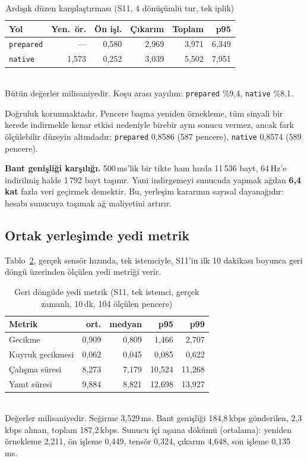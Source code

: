 \documentclass[conference]{IEEEtran}
\newcommand{\ms}{\,ms\xspace}
\begin{document}
\begin{table}[t]
\caption{Ardışık düzen karşılaştırması (S11, 4 dönüşümlü tur, tek iplik)}
\label{tab:pipeline}
\centering
\small
\setlength{\tabcolsep}{4pt}
\begin{tabular}{lrrrrr}
\toprule
\textbf{Yol} & \textbf{Yen.\ ör.} & \textbf{Ön işl.} & \textbf{Çıkarım} & \textbf{Toplam} & \textbf{p95}\\
\midrule
\texttt{prepared} & ---       & 0{,}580 & 2{,}969 & 3{,}971 & 6{,}349\\
\texttt{native}   & 1{,}573   & 0{,}252 & 3{,}039 & 5{,}502 & 7{,}951\\
\bottomrule
\end{tabular}
\\[2pt]
\footnotesize Bütün değerler milisaniyedir. Koşu arası yayılım: \texttt{prepared}
\%9{,}4, \texttt{native} \%8{,}1.
\end{table}

Doğruluk korunmaktadır. Pencere başına yeniden örnekleme, tüm sinyali bir kerede
indirmekle kenar etkisi nedeniyle birebir aynı sonucu vermez, ancak fark
ölçülebilir düzeyin altındadır: \texttt{prepared} 0{,}8586 (587 pencere),
\texttt{native} 0{,}8574 (589 pencere).

\textbf{Bant genişliği karşılığı.} 500\ms'lik bir tikte ham hızda 11\,536 bayt,
64\,Hz'e indirilmiş halde 1\,792 bayt taşınır. Yani indirgemeyi sunucuda yapmak
ağdan \textbf{6{,}4 kat} fazla veri geçirmek demektir. Bu, yerleşim kararının
sayısal dayanağıdır: hesabı sunucuya taşımak ağ maliyetini artırır.

\subsection{Ortak yerleşimde yedi metrik}

Tablo~\ref{tab:loopback}, gerçek sensör hızında, tek istemciyle, S11'in ilk 10
dakikası boyunca geri döngü üzerinden ölçülen yedi metriği verir.

\begin{table}[t]
\caption{Geri döngüde yedi metrik (S11, tek istemci, gerçek zamanlı, 10\,dk,
104 ölçülen pencere)}
\label{tab:loopback}
\centering
\small
\begin{tabular}{lrrrr}
\toprule
\textbf{Metrik} & \textbf{ort.} & \textbf{medyan} & \textbf{p95} & \textbf{p99}\\
\midrule
Gecikme          & 0{,}909 & 0{,}809 & 1{,}466 & 2{,}707\\
Kuyruk gecikmesi & 0{,}062 & 0{,}045 & 0{,}085 & 0{,}622\\
Çalışma süresi   & 8{,}273 & 7{,}179 & 10{,}524 & 11{,}268\\
Yanıt süresi     & 9{,}884 & 8{,}821 & 12{,}698 & 13{,}927\\
\bottomrule
\end{tabular}
\\[2pt]
\footnotesize Değerler milisaniyedir. Seğirme 3{,}529\ms. Bant genişliği
184{,}8\,kbps gönderilen, 2{,}3\,kbps alınan, toplam 187{,}2\,kbps. Sunucu içi
aşama dökümü (ortalama): yeniden örnekleme 2{,}211, ön işleme 0{,}449, tensör
0{,}324, çıkarım 4{,}648, son işleme 0{,}135\ms.
\end{table}
\end{document}
